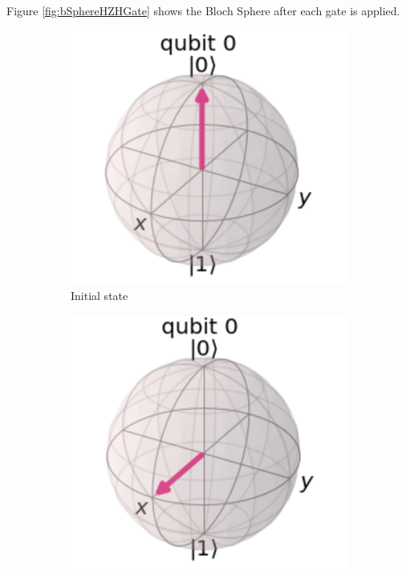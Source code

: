 Figure \ref{fig:bSphereHZHGate} shows the Bloch Sphere after each gate is applied.

\begin{figure}[h]
    \centering
    \begin{subfigure}[h]{0.24\textwidth}
        \centering
        \includegraphics[width=\textwidth]{lab2/images/hzhGate1.png}
        \caption{Initial state}
        \label{fig:hzhGate1}
    \end{subfigure}
    \hfill
    \begin{subfigure}[h]{0.24\textwidth}
        \centering
        \includegraphics[width=\textwidth]{lab2/images/hzhGate2.png}

\end{subfigure}
\end{figure}

